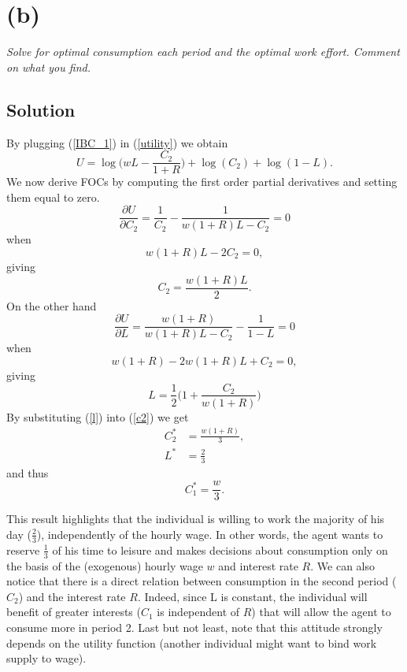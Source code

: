 \documentclass[a4paper,10pt]{report}
\begin{document}
\section*{(b)}
\textit{Solve for optimal consumption each period and the optimal work effort. Comment on
what you find.}
\subsection*{Solution}
By plugging (\ref{IBC_1}) in (\ref{utility}) we obtain 
\begin{equation}
	U = \log\bigg(wL - \frac{C_2}{1+R}\bigg) + \log(C_2) + \log(1-L).
\end{equation}
We now derive FOCs by computing the first order partial derivatives and setting them equal to zero.
\[
\frac{\partial{U}}{\partial{C_2}} = \frac{1}{C_2} - \frac{1}{w(1+R)L -C_2} = 0
\]
when 
\[
w(1+R)L - 2C_2 = 0, 
\]
giving 
\begin{equation}\label{c2}
	C_2 = \frac{w(1+R)L}{2}.
\end{equation}
On the other hand
\[
\frac{\partial{U}}{\partial{L}} = \frac{w(1+R)}{w(1+R)L -C_2}- \frac{1}{1-L} = 0
\]
when 
\[
w(1+R) - 2w(1+R)L + C_2 = 0, 
\]
giving 
\begin{equation}\label{l}
	L = \frac{1}{2}\bigg(1+\frac{C_2}{w(1+R)}\bigg)
\end{equation}
By substituting (\ref{l}) into (\ref{c2}) we get
\begin{equation}\label{eq: optimum_b_C2_L}
    \begin{split}
            C_2^* &= \frac{w(1+R)}{3}, \\
		L^* &= \frac{2}{3}
    \end{split}
\end{equation}
and thus
\begin{equation}\label{eq: optimum_b_C1}
		C_1^* = \frac{w}{3}.
\end{equation}

This result highlights that the individual is willing to work the majority of his day ($\frac{2}{3}$), independently of the hourly wage. In other words, the agent wants to reserve $\frac{1}{3}$ of his time to leisure and makes decisions about consumption only on the basis of the (exogenous) hourly wage $w$ and interest rate $R$. We can also notice that there is a direct relation between consumption in the second period ($C_2$) and the interest rate $R$. Indeed, since L is constant, the individual will benefit of greater interests ($C_1$ is independent of $R$) that will allow the agent to consume more in period 2. Last but not least, note that this attitude strongly depends on the utility function (another individual might want to bind work supply to wage).
\end{document}
